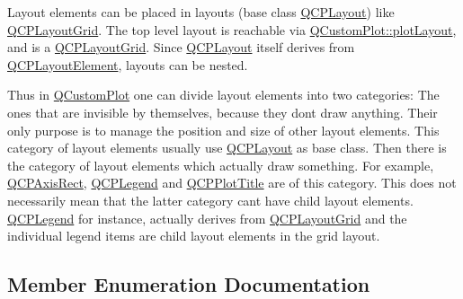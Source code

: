 Layout elements can be placed in layouts (base class \hyperlink{classQCPLayout}{Q\+C\+P\+Layout}) like \hyperlink{classQCPLayoutGrid}{Q\+C\+P\+Layout\+Grid}. The top level layout is reachable via \hyperlink{classQCustomPlot_afd280d4d621ae64a106543a545c508d7}{Q\+Custom\+Plot\+::plot\+Layout}, and is a \hyperlink{classQCPLayoutGrid}{Q\+C\+P\+Layout\+Grid}. Since \hyperlink{classQCPLayout}{Q\+C\+P\+Layout} itself derives from \hyperlink{classQCPLayoutElement}{Q\+C\+P\+Layout\+Element}, layouts can be nested.

Thus in \hyperlink{classQCustomPlot}{Q\+Custom\+Plot} one can divide layout elements into two categories\+: The ones that are invisible by themselves, because they don\textquotesingle{}t draw anything. Their only purpose is to manage the position and size of other layout elements. This category of layout elements usually use \hyperlink{classQCPLayout}{Q\+C\+P\+Layout} as base class. Then there is the category of layout elements which actually draw something. For example, \hyperlink{classQCPAxisRect}{Q\+C\+P\+Axis\+Rect}, \hyperlink{classQCPLegend}{Q\+C\+P\+Legend} and \hyperlink{classQCPPlotTitle}{Q\+C\+P\+Plot\+Title} are of this category. This does not necessarily mean that the latter category can\textquotesingle{}t have child layout elements. \hyperlink{classQCPLegend}{Q\+C\+P\+Legend} for instance, actually derives from \hyperlink{classQCPLayoutGrid}{Q\+C\+P\+Layout\+Grid} and the individual legend items are child layout elements in the grid layout. 

\subsection{Member Enumeration Documentation}
